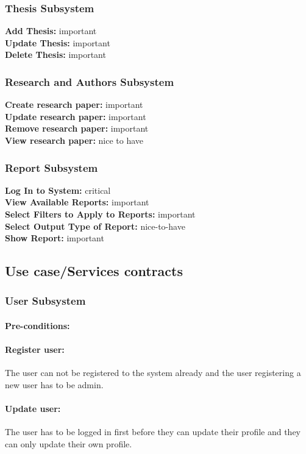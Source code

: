 \documentclass{article}
\begin{document}
			\subsubsection{Thesis Subsystem}
				\textbf{Add Thesis:} important\\
				\textbf{Update Thesis:} important\\
				\textbf{Delete Thesis:} important
			\subsubsection{Research and Authors Subsystem}
				\textbf{Create research paper:} important\\
				\textbf{Update research paper:} important\\
				\textbf{Remove research paper:} important\\
				\textbf{View research paper:} nice to have\\
			\subsubsection{Report Subsystem}
				\textbf{Log In to System:} critical\\
				\textbf{View Available Reports:} important\\
				\textbf{Select Filters to Apply to Reports:} important\\
				\textbf{Select Output Type of Report:} nice-to-have\\
				\textbf{Show Report:} important\\
		\subsection{Use case/Services contracts}
			\subsubsection{User Subsystem}
				\paragraph{Pre-conditions:}
				\paragraph{Register user:} The user can not be registered to the system already and the user registering a new user has to be admin.
				\paragraph{Update user:} The user has to be logged in first before they can update their profile and they can only update their own profile.
\end{document}
